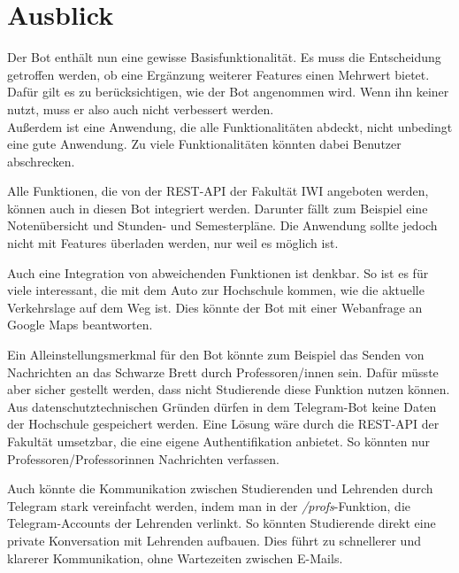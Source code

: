 \section{Ausblick}
Der Bot enthält nun eine gewisse Basisfunktionalität. Es muss die Entscheidung getroffen werden, ob eine Ergänzung weiterer Features einen Mehrwert bietet. Dafür gilt es zu berücksichtigen, wie der Bot angenommen wird. Wenn ihn keiner nutzt, muss er also auch nicht verbessert werden. \\
Außerdem ist eine Anwendung, die alle Funktionalitäten abdeckt, nicht unbedingt eine gute Anwendung. Zu viele Funktionalitäten könnten dabei Benutzer abschrecken.

Alle Funktionen, die von der REST-API der Fakultät IWI angeboten werden, können auch in diesen Bot integriert werden. Darunter fällt zum Beispiel eine Notenübersicht und Stunden- und Semesterpläne. Die Anwendung sollte jedoch nicht mit Features überladen werden, nur weil es möglich ist.

Auch eine Integration von abweichenden Funktionen ist denkbar. So ist es für viele interessant, die mit dem Auto zur Hochschule kommen, wie die aktuelle Verkehrslage auf dem Weg ist. Dies könnte der Bot mit einer Webanfrage an Google Maps beantworten.

Ein Alleinstellungsmerkmal für den Bot könnte zum Beispiel das Senden von Nachrichten an das Schwarze Brett durch Professoren/innen sein. Dafür müsste aber sicher gestellt werden, dass nicht Studierende diese Funktion nutzen können. Aus datenschutztechnischen Gründen dürfen in dem Telegram-Bot keine Daten der Hochschule gespeichert werden. Eine Lösung wäre durch die REST-API der Fakultät umsetzbar, die eine eigene Authentifikation anbietet. So könnten nur Professoren/Professorinnen Nachrichten verfassen.

Auch könnte die Kommunikation zwischen Studierenden und Lehrenden durch Telegram stark vereinfacht werden, indem man in der \emph{/profs}-Funktion, die Telegram-Accounts der Lehrenden verlinkt. So könnten Studierende direkt eine private Konversation mit Lehrenden aufbauen. Dies führt zu schnellerer und klarerer Kommunikation, ohne Wartezeiten zwischen E-Mails.
